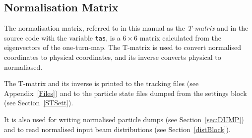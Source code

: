 \subsection{Normalisation Matrix} \label{Sec:TMatrix}

The normalisation matrix, referred to in this manual as the \emph{T-matrix} and in the source code with the variable \texttt{tas}, is a $6 \times 6$ matrix calculated from the eigenvectors of the one-turn-map.
The T-matrix is used to convert normalised coordinates to physical coordinates, and its inverse converts physical to normaliased.

The T-matrix and its inverse is printed to the tracking files (see Appendix~\ref{Files}) and to the particle state files dumped from the settings block (see Section~\ref{STSett}).

It is also used for writing normalised particle dumps (see Section~\ref{sec:DUMP}) and to read normalised input beam distributions (see Section~\ref{distBlock}).
